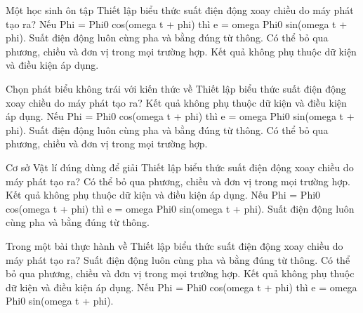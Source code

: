 \begin{ex}
Một học sinh ôn tập Thiết lập biểu thức suất điện động xoay chiều do máy phát tạo ra?
\choice
{\True Nếu Phi = Phi0 cos(omega t + phi) thì e = omega Phi0 sin(omega t + phi).}
{Suất điện động luôn cùng pha và bằng đúng từ thông.}
{Có thể bỏ qua phương, chiều và đơn vị trong mọi trường hợp.}
{Kết quả không phụ thuộc dữ kiện và điều kiện áp dụng.}
\end{ex}

\begin{ex}
Chọn phát biểu không trái với kiến thức về Thiết lập biểu thức suất điện động xoay chiều do máy phát tạo ra?
\choice
{Kết quả không phụ thuộc dữ kiện và điều kiện áp dụng.}
{\True Nếu Phi = Phi0 cos(omega t + phi) thì e = omega Phi0 sin(omega t + phi).}
{Suất điện động luôn cùng pha và bằng đúng từ thông.}
{Có thể bỏ qua phương, chiều và đơn vị trong mọi trường hợp.}
\end{ex}

\begin{ex}
Cơ sở Vật lí đúng dùng để giải Thiết lập biểu thức suất điện động xoay chiều do máy phát tạo ra?
\choice
{Có thể bỏ qua phương, chiều và đơn vị trong mọi trường hợp.}
{Kết quả không phụ thuộc dữ kiện và điều kiện áp dụng.}
{\True Nếu Phi = Phi0 cos(omega t + phi) thì e = omega Phi0 sin(omega t + phi).}
{Suất điện động luôn cùng pha và bằng đúng từ thông.}
\end{ex}

\begin{ex}
Trong một bài thực hành về Thiết lập biểu thức suất điện động xoay chiều do máy phát tạo ra?
\choice
{Suất điện động luôn cùng pha và bằng đúng từ thông.}
{Có thể bỏ qua phương, chiều và đơn vị trong mọi trường hợp.}
{Kết quả không phụ thuộc dữ kiện và điều kiện áp dụng.}
{\True Nếu Phi = Phi0 cos(omega t + phi) thì e = omega Phi0 sin(omega t + phi).}
\end{ex}

